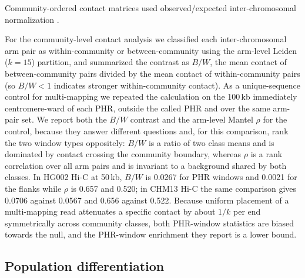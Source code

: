 \documentclass[pdflatex,mathphys]{jnl}
\begin{document}
Community-ordered contact matrices used observed/expected inter-chromosomal normalization \cite{hic3d_liebermanaiden2009,hic3d_imakaev2012}.

For the community-level contact analysis we classified each inter-chromosomal
arm pair as within-community or between-community using the arm-level Leiden
($k=15$) partition, and summarized the contrast as $B/W$, the mean contact of
between-community pairs divided by the mean contact of within-community pairs
(so $B/W<1$ indicates stronger within-community contact). %
As a unique-sequence control for multi-mapping we repeated the calculation on
the 100\,kb immediately centromere-ward of each PHR, outside the called PHR and
over the same arm-pair set. We report both the $B/W$ contrast and the arm-level
Mantel $\rho$ for the control, because they answer different questions and, for
this comparison, rank the two window types oppositely: $B/W$ is a ratio of two
class means and is dominated by contact crossing the community boundary,
whereas $\rho$ is a rank correlation over all arm pairs and is invariant to a
background shared by both classes. In HG002 Hi-C at 50\,kb, $B/W$ is 0.0267 for
PHR windows and 0.0021 for the flanks while $\rho$ is 0.657 and 0.520; in CHM13
Hi-C the same comparison gives 0.0706 against 0.0567 and 0.656 against 0.522.
Because uniform placement of a multi-mapping read attenuates a specific contact
by about $1/k$ per end symmetrically across community classes, both PHR-window
statistics are biased towards the null, and the PHR-window enrichment they
report is a lower bound.

\subsection*{Population differentiation}
\end{document}
